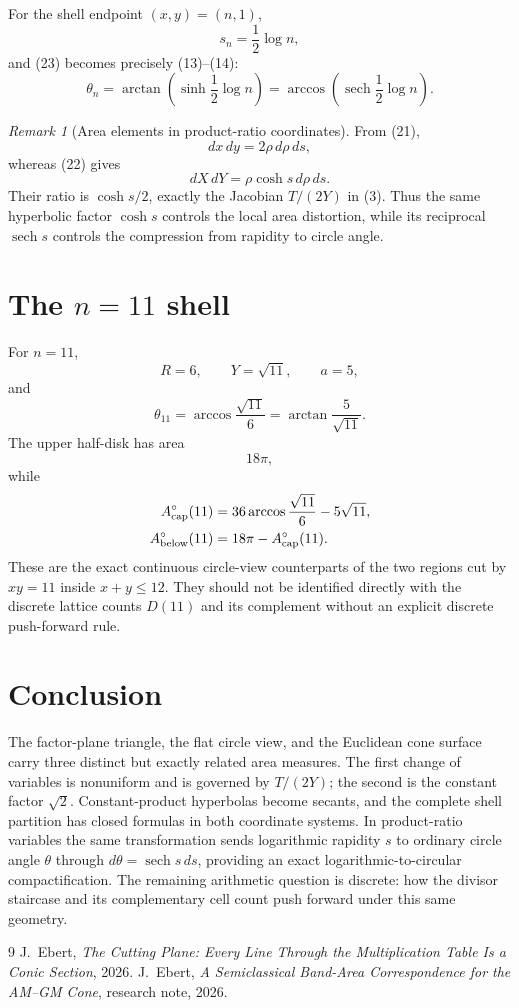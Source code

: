 \documentclass[11pt]{amsart}
\theoremstyle{remark}
\newtheorem{remark}[proposition]{Remark}
\begin{document}
For the shell endpoint $(x,y)=(n,1)$,
\begin{equation}
s_n=\frac12\log n, \tag{27}
\end{equation}
and (23) becomes precisely (13)--(14):
\begin{equation}
\boxed{
\theta_n
=\arctan\!\left(\sinh\frac12\log n\right)
=\arccos\!\left(\operatorname{sech}\frac12\log n\right).}
\tag{28}
\end{equation}

\begin{remark}[Area elements in product-ratio coordinates]
From (21),
\[
dx\,dy=2\rho\,d\rho\,ds,
\]
whereas (22) gives
\[
dX\,dY=\rho\cosh s\,d\rho\,ds.
\]
Their ratio is $\cosh s/2$, exactly the Jacobian $T/(2Y)$ in (3).  Thus the same hyperbolic factor $\cosh s$ controls the local area distortion, while its reciprocal $\operatorname{sech}s$ controls the compression from rapidity to circle angle.
\end{remark}

\section{The $n=11$ shell}
For $n=11$,
\[
R=6,\qquad Y=\sqrt{11},\qquad a=5,
\]
and
\[
\theta_{11}=\arccos\frac{\sqrt{11}}6
=\arctan\frac5{\sqrt{11}}.
\]
The upper half-disk has area
\[
18\pi,
\]
while
\begin{align*}
A_{\rm cap}^{\circ}(11)
&=36\arccos\frac{\sqrt{11}}6-5\sqrt{11},\\
A_{\rm below}^{\circ}(11)
&=18\pi-A_{\rm cap}^{\circ}(11).
\end{align*}
These are the exact continuous circle-view counterparts of the two regions cut by $xy=11$ inside $x+y\le12$.  They should not be identified directly with the discrete lattice counts $D(11)$ and its complement without an explicit discrete push-forward rule.

\section{Conclusion}
The factor-plane triangle, the flat circle view, and the Euclidean cone surface carry three distinct but exactly related area measures.  The first change of variables is nonuniform and is governed by $T/(2Y)$; the second is the constant factor $\sqrt2$.  Constant-product hyperbolas become secants, and the complete shell partition has closed formulas in both coordinate systems.  In product-ratio variables the same transformation sends logarithmic rapidity $s$ to ordinary circle angle $\theta$ through $d\theta=\operatorname{sech}s\,ds$, providing an exact logarithmic-to-circular compactification.  The remaining arithmetic question is discrete: how the divisor staircase and its complementary cell count push forward under this same geometry.

\begin{thebibliography}{9}
 J.~Ebert, \emph{The Cutting Plane: Every Line Through the Multiplication Table Is a Conic Section}, 2026.
 J.~Ebert, \emph{A Semiclassical Band-Area Correspondence for the AM--GM Cone}, research note, 2026.
\end{thebibliography}
\end{document}
